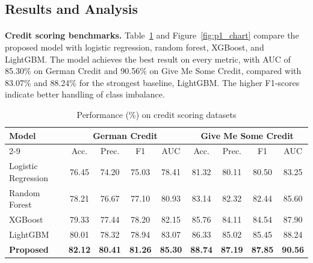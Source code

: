 \documentclass[12pt,a4paper,final]{extreport}
\begin{document}
\subsection{Results and Analysis}

\paragraph{} \textbf{Credit scoring benchmarks.} Table~\ref{tab:p1_credit} and Figure~\ref{fig:p1_chart} compare the proposed model with logistic regression, random forest, XGBoost, and LightGBM. The model achieves the best result on every metric, with AUC of 85.30\% on German Credit and 90.56\% on Give Me Some Credit, compared with 83.07\% and 88.24\% for the strongest baseline, LightGBM. The higher F1-scores indicate better handling of class imbalance.

{\renewcommand{\arraystretch}{1.2}
\begin{table}[htbp]
\centering
\caption{Performance (\%) on credit scoring datasets \cite{p1}}\label{tab:p1_credit}
\small
\begin{tabular}{|l|c|c|c|c|c|c|c|c|}
\hline
\multirow{2}{*}{\textbf{Model}} & \multicolumn{4}{c|}{\textbf{German Credit}} & \multicolumn{4}{c|}{\textbf{Give Me Some Credit}} \\ \cline{2-9}
 & Acc. & Prec. & F1 & AUC & Acc. & Prec. & F1 & AUC \\ \hline
Logistic Regression & 76.45 & 74.20 & 75.03 & 78.41 & 81.32 & 80.11 & 80.50 & 83.25 \\ \hline
Random Forest & 78.21 & 76.67 & 77.10 & 80.93 & 83.14 & 82.32 & 82.44 & 85.60 \\ \hline
XGBoost & 79.33 & 77.44 & 78.20 & 82.15 & 85.76 & 84.11 & 84.54 & 87.90 \\ \hline
LightGBM & 80.01 & 78.32 & 78.94 & 83.07 & 86.33 & 85.02 & 85.45 & 88.24 \\ \hline
\textbf{Proposed} & \textbf{82.12} & \textbf{80.41} & \textbf{81.26} & \textbf{85.30} & \textbf{88.74} & \textbf{87.19} & \textbf{87.85} & \textbf{90.56} \\ \hline
\end{tabular}
\end{table}}
\end{document}
